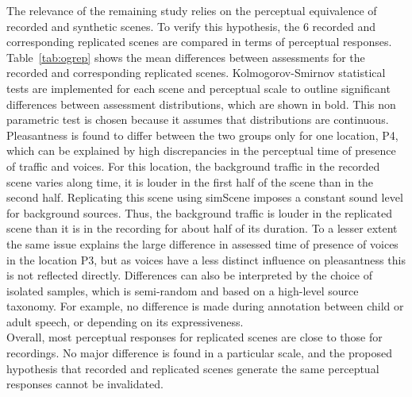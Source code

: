 \documentclass[11pt,a4paper]{article}
\begin{document}
The relevance of the remaining study relies on the perceptual equivalence of recorded and synthetic scenes. To verify this hypothesis, the 6 recorded and corresponding replicated scenes are compared in terms of perceptual responses.\\

Table~\ref{tab:ogrep} shows the mean differences between assessments for the recorded and corresponding replicated scenes. Kolmogorov-Smirnov statistical tests are implemented for each scene and perceptual scale to outline significant differences between assessment distributions, which are shown in bold. This non parametric test is chosen because it assumes that distributions are continuous. Pleasantness is found to differ between the two groups only for one location, P4, which can be explained by high discrepancies in the perceptual time of presence of traffic and voices. For this location, the background traffic in the recorded scene varies along time, it is louder in the first half of the scene than in the second half. Replicating this scene using simScene imposes a constant sound level for background sources. Thus, the background traffic is louder in the replicated scene than it is in the recording for about half
of its duration. To a lesser extent the same issue explains the large difference in assessed time of presence of voices in the location P3, but as voices have a less distinct influence on pleasantness this is not reflected directly. Differences can also be interpreted by the choice of isolated samples, which is semi-random and based on a high-level source taxonomy. For example, no difference is made during annotation between child or adult speech, or depending on its expressiveness.\\

Overall, most perceptual responses for replicated scenes are close to those for recordings. No major difference is found in a particular scale, and the proposed hypothesis that recorded and replicated scenes generate the same perceptual responses cannot be invalidated.
\end{document}
